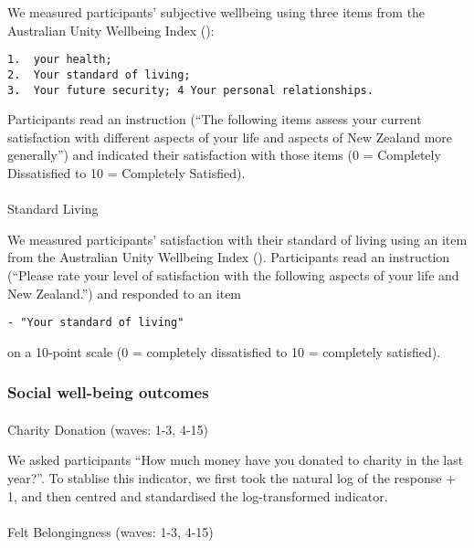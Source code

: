 \documentclass[
  singlecolumn,
  9pt]{scrartcl}
\makeatletter
\let\oldparagraph\paragraph
\renewcommand{\paragraph}{
    \@ifstar
      \xxxParagraphStar
      \xxxParagraphNoStar
  }
\newcommand{\xxxParagraphStar}[1]{\oldparagraph*{#1}\mbox{}}
\newcommand{\xxxParagraphNoStar}[1]{\oldparagraph{#1}\mbox{}}
\makeatother
\begin{document}
We measured participants' subjective wellbeing using three items from
the Australian Unity Wellbeing Index
():

\begin{verbatim}
1.  your health;
2.  Your standard of living;
3.  Your future security; 4 Your personal relationships.
\end{verbatim}

Participants read an instruction (``The following items assess your
current satisfaction with different aspects of your life and aspects of
New Zealand more generally'') and indicated their satisfaction with
those items (0 = Completely Dissatisfied to 10 = Completely Satisfied).

\paragraph{Standard Living}\label{standard-living}

We measured participants' satisfaction with their standard of living
using an item from the Australian Unity Wellbeing Index
().
Participants read an instruction (``Please rate your level of
satisfaction with the following aspects of your life and New Zealand.'')
and responded to an item

\begin{verbatim}
- "Your standard of living"
\end{verbatim}

on a 10-point scale (0 = completely dissatisfied to 10 = completely
satisfied).

\subsubsection{Social well-being
outcomes}\label{social-well-being-outcomes}

\paragraph{Charity Donation (waves: 1-3,
4-15)}\label{charity-donation-waves-1-3-4-15}

We asked participants ``How much money have you donated to charity in
the last year?''. To stablise this indicator, we first took the natural
log of the response + 1, and then centred and standardised the
log-transformed indicator.

\paragraph{Felt Belongingness (waves: 1-3,
4-15)}\label{felt-belongingness-waves-1-3-4-15}
\end{document}
